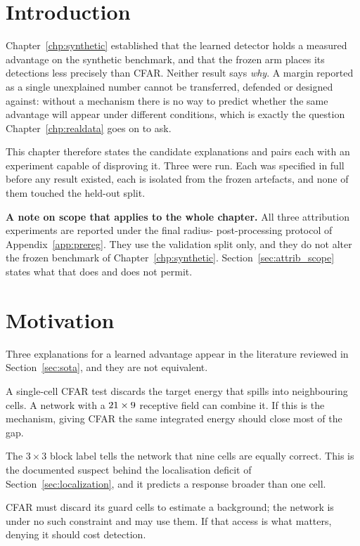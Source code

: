 
\section{Introduction}

Chapter~\ref{chp:synthetic} established that the learned detector holds a measured advantage on the
synthetic benchmark, and that the frozen arm places its detections less precisely than CFAR. Neither
result says \emph{why}. A margin reported
as a single unexplained number cannot be transferred, defended or designed against: without a
mechanism there is no way to predict whether the same advantage will appear under different
conditions, which is exactly the question Chapter~\ref{chp:realdata} goes on to ask.

This chapter therefore states the candidate explanations and pairs each with an experiment capable
of disproving it. Three were run. Each was specified in full before any result existed, each is isolated from the
frozen artefacts, and none of them touched the held-out split.

\textbf{A note on scope that applies to the whole chapter.} All three attribution experiments are
reported under the final radius-\ProtocolNms{} post-processing protocol of
Appendix~\ref{app:prereg}. They use the validation split only, and they do not alter the frozen
benchmark of Chapter~\ref{chp:synthetic}. Section~\ref{sec:attrib_scope} states what that does and
does not permit.

\section{Motivation}

Three explanations for a learned advantage appear in the literature reviewed in
Section~\ref{sec:sota}, and they are not equivalent.

\begin{description}
\itemsep3pt
\item[Energy integration.] A single-cell CFAR test discards the target energy that spills into
neighbouring cells. A network with a $21 \times 9$ receptive field can combine it. If
this is the mechanism, giving CFAR the same integrated energy should close most of the gap.
\item[Supervision.] The $3\times3$ block label tells the network that nine cells are equally
correct. This is the documented suspect behind the localisation deficit of
Section~\ref{sec:localization}, and it predicts a response broader than one cell.
\item[Information access.] CFAR must discard its guard cells to estimate a background; the network
is under no such constraint and may use them. If that access is what matters, denying it should cost
detection.
\end{description}


